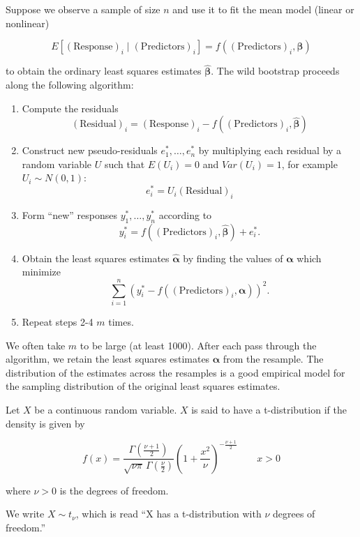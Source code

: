 \documentclass[
  letterpaper,
  DIV=11,
  numbers=noendperiod]{scrreprt}
\providecommand{\tightlist}{%
  \setlength{\itemsep}{0pt}\setlength{\parskip}{0pt}}\usepackage{longtable,booktabs,array}
\theoremstyle{definition}
\theoremstyle{definition}
\theoremstyle{remark}
\begin{document}
\begin{description}
\tightlist
\item[Wild Bootstrap (Definition~\ref{def-wild-bootstrap})]
Suppose we observe a sample of size \(n\) and use it to fit the mean
model (linear or nonlinear)
\end{description}

\[E\left[(\text{Response})_i \mid (\text{Predictors})_i\right]= f\left((\text{Predictors})_i, \boldsymbol{\beta}\right)\]

to obtain the ordinary least squares estimates
\(\widehat{\boldsymbol{\beta}}\). The wild bootstrap proceeds along the
following algorithm:

\begin{enumerate}
\def\labelenumi{\arabic{enumi}.}
\tightlist
\item
  Compute the residuals
  \[(\text{Residual})_i = (\text{Response})_i - f\left((\text{Predictors})_i, \widehat{\boldsymbol{\beta}}\right)\]
\item
  Construct new pseudo-residuals \(e_1^*, \dotsc, e_n^*\) by multiplying
  each residual by a random variable \(U\) such that
  \(E\left(U_i\right) = 0\) and \(Var\left(U_i\right) = 1\), for example
  \(U_i \sim N(0,1)\): \[e_i^* = U_i (\text{Residual})_i\]
\item
  Form ``new'' responses \(y_1^*, \dotsc, y_n^*\) according to
  \[y_i^* = f\left((\text{Predictors})_i, \widehat{\boldsymbol{\beta}}\right) + e_i^*.\]
\item
  Obtain the least squares estimates \(\widehat{\boldsymbol{\alpha}}\)
  by finding the values of \(\boldsymbol{\alpha}\) which minimize
  \[\sum_{i=1}^{n} \left(y_i^* - f\left((\text{Predictors})_i, \boldsymbol{\alpha}\right)\right)^2.\]
\item
  Repeat steps 2-4 \(m\) times.
\end{enumerate}

We often take \(m\) to be large (at least 1000). After each pass through
the algorithm, we retain the least squares estimates
\(\widehat{\boldsymbol{\alpha}}\) from the resample. The distribution of
the estimates across the resamples is a good empirical model for the
sampling distribution of the original least squares estimates.

\begin{description}
\tightlist
\item[t-Distribution (Definition~\ref{def-t-distribution})]
Let \(X\) be a continuous random variable. \(X\) is said to have a
t-distribution if the density is given by
\end{description}

\[f(x) = \frac{\Gamma \left(\frac{\nu+1}{2} \right)} {\sqrt{\nu\pi}\,\Gamma \left(\frac{\nu}{2} \right)} \left(1+\frac{x^2}{\nu} \right)^{-\frac{\nu+1}{2}} \qquad x > 0\]

where \(\nu > 0\) is the degrees of freedom.

We write \(X \sim t_{\nu}\), which is read ``X has a t-distribution with
\(\nu\) degrees of freedom.''
\end{document}
